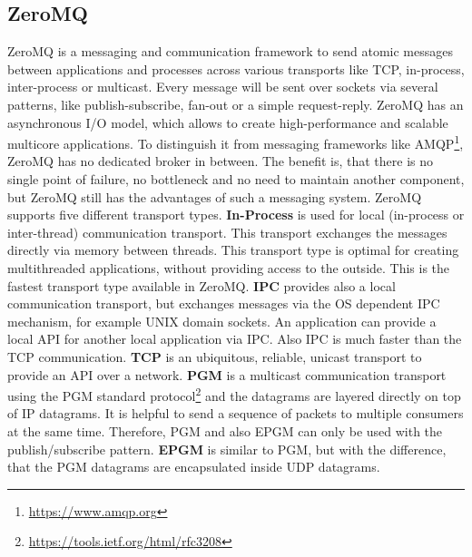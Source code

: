 \subsection{ZeroMQ}
\label{section:ZeroMQ}
ZeroMQ is a messaging and communication framework to send atomic messages between applications and processes across various transports like \ac{TCP}, in-process, inter-process or multicast.\autocite[cf.]{ZeroMQ:Guide}
Every message will be sent over sockets via several patterns, like publish-subscribe, fan-out or a simple request-reply.\autocite[cf.]{ZeroMQ:Guide}
ZeroMQ has an asynchronous I/O model, which allows to create high-performance and scalable multicore applications.\autocite[cf.]{ZeroMQ:Guide}
To distinguish it from messaging frameworks like \ac{AMQP}\footnote{\url{https://www.amqp.org}}, ZeroMQ has no dedicated broker in between.
The benefit is, that there is no single point of failure, no bottleneck and no need to maintain another component, but ZeroMQ still has the advantages of such a messaging system.
ZeroMQ supports five different transport types.\newline\newline
\textbf{In-Process} is used for local (in-process or inter-thread) communication transport.
This transport exchanges the messages directly via memory between threads.\autocite[cf.]{ZeroMQ:inproc}
This transport type is optimal for creating multithreaded applications, without providing access to the outside.
This is the fastest transport type available in ZeroMQ.\newline\newline
\textbf{\ac{IPC}} provides also a local communication transport, but exchanges messages via the \ac{OS} dependent \ac{IPC} mechanism, for example UNIX domain sockets.
An application can provide a local \ac{API} for another local application via \ac{IPC}.
Also \ac{IPC} is much faster than the \ac{TCP} communication.\autocite[cf.]{ZeroMQ:IPC}\newline\newline
\textbf{\ac{TCP}} is an ubiquitous, reliable, unicast transport to provide an \ac{API} over a network.\autocite[cf.]{ZeroMQ:tcp}\newline\newline
\textbf{\ac{PGM}} is a multicast communication transport using the \ac{PGM} standard protocol\footnote{\url{https://tools.ietf.org/html/rfc3208}} and the datagrams are layered directly on top of IP datagrams.\autocite[cf.]{ZeroMQ:pgm}
It is helpful to send a sequence of packets to multiple consumers at the same time.
Therefore, \ac{PGM} and also \acs{EPGM} can only be used with the publish/subscribe pattern.\newline\newline
\textbf{\ac{EPGM}} is similar to \ac{PGM}, but with the difference, that the PGM datagrams are encapsulated inside \ac{UDP} datagrams.\autocite[cf.]{ZeroMQ:pgm}

